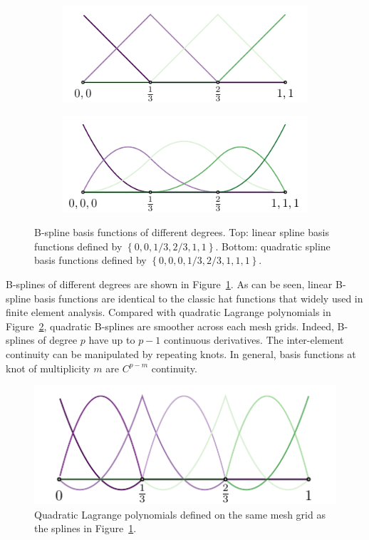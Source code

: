 \begin{figure}[ht]
    \center
    \begin{subfigure}[t]{\linewidth}
        \center
        \includegraphics[scale=1.2]{p=1_space}
    \end{subfigure}
    \begin{subfigure}[t]{\linewidth}
        \center
        \includegraphics[scale=1.2]{p=2_space}
    \end{subfigure}
    \caption[B-spline basis functions of different degrees.]{B-spline basis functions of different degrees. Top: linear spline basis functions defined by $\left\{0,0,1/3,2/3,1,1\right\}$. Bottom: quadratic spline basis functions defined by $\left\{0,0,0,1/3,2/3,1,1,1\right\}$.}\label{fig:spline_basis}
\end{figure}

B-splines of different degrees are shown in Figure~\ref{fig:spline_basis}. As can be seen, linear B-spline basis functions are identical to the classic hat functions that widely used in finite element analysis. Compared with quadratic Lagrange polynomials in Figure~\ref{fig:lagrange_polynomial}, quadratic B-splines are smoother across each mesh grids. Indeed, B-splines of degree $p$ have up to $p-1$ continuous derivatives. The inter-element continuity can be manipulated by repeating knots. In general, basis functions at knot of multiplicity $m$ are $C^{p-m}$ continuity.

\begin{figure}[ht]
    \center\includegraphics[scale=1.2]{p=2_space_2}
    \caption{Quadratic Lagrange polynomials defined on the same mesh grid as the splines in Figure~\ref{fig:spline_basis}.}\label{fig:lagrange_polynomial}
\end{figure}


